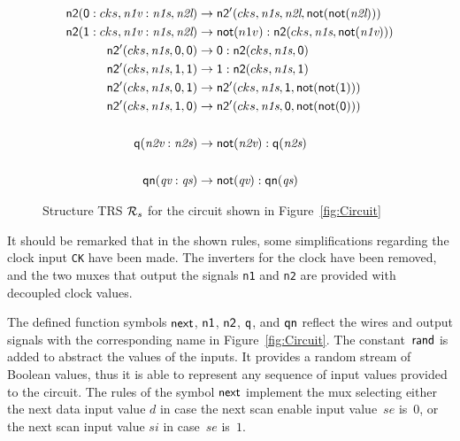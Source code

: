\documentclass{eptcs}
\begin{document}
\begin{figure}[t]
\begin{align*}
\mathsf{n2}(\mathsf{0} : cks,\textit{n1v} : \textit{n1s},\textit{n2l})
&\to
      \mathsf{n2}'(cks,\textit{n1s},\textit{n2l},
            \mathsf{not}(\mathsf{not}(\textit{n2l})))
\\
\mathsf{n2}(\mathsf{1} : cks,\textit{n1v} : \textit{n1s},\textit{n2l})
&\to
      \mathsf{not}(n1v) :\mathsf{n2}(cks,\textit{n1s},\mathsf{not}(\textit{n1v})))
\\
\mathsf{n2}'(cks,\textit{n1s},\mathsf{0},\mathsf{0}) &\to
            \mathsf{0} : \mathsf{n2}(cks,\textit{n1s},\mathsf{0})
\\
\mathsf{n2}'(cks,\textit{n1s},\mathsf{1},\mathsf{1}) &\to 
            \mathsf{1} : \mathsf{n2}(cks,\textit{n1s},\mathsf{1})
\\
\mathsf{n2}'(cks,\textit{n1s},\mathsf{0},\mathsf{1}) &\to
      \mathsf{n2}'(cks,\textit{n1s},\mathsf{1},\mathsf{not}(\mathsf{not}(\mathsf{1})))
\\
\mathsf{n2}'(cks,\textit{n1s},\mathsf{1},\mathsf{0}) &\to
      \mathsf{n2}'(cks,\textit{n1s},\mathsf{0},\mathsf{not}(\mathsf{not}(\mathsf{0})))
\\
\\
\mathsf{q}(\textit{n2v} : \textit{n2s}) &\to
    \mathsf{not}(\textit{n2v}) : \mathsf{q}(\textit{n2s})
\\
\\
\mathsf{qn}(\textit{qv} : \textit{qs}) &\to
    \mathsf{not}(\textit{qv}) : \mathsf{qn}(\textit{qs})
\end{align*}
\caption{Structure TRS $\mathcal{R}_s$ for the circuit shown in Figure~\ref{fig:Circuit}}
\label{fig:HWrules}
\end{figure}

It should be remarked that in the shown rules, some simplifications regarding
the clock input \texttt{CK} have been made. The inverters for the clock have
been removed, and the two muxes that output the signals \texttt{n1} and
\texttt{n2} are provided with decoupled clock values.

The defined function symbols $\mathsf{next}$, $\mathsf{n1}$, $\mathsf{n2}$,
$\mathsf{q}$, and $\mathsf{qn}$ reflect the wires and output signals with the
corresponding name in Figure~\ref{fig:Circuit}.
The constant~$\mathsf{rand}$ is added to abstract the values of the inputs. It
provides a random stream of Boolean values, thus it is able to represent any
sequence of input values provided to the circuit.
The rules of the symbol $\mathsf{next}$ implement the mux selecting either the
next data input value $d$ in case the next scan enable input value~$se$ is~$0$,
or the next scan input value $si$ in case~$se$ is~$1$.
\end{document}
